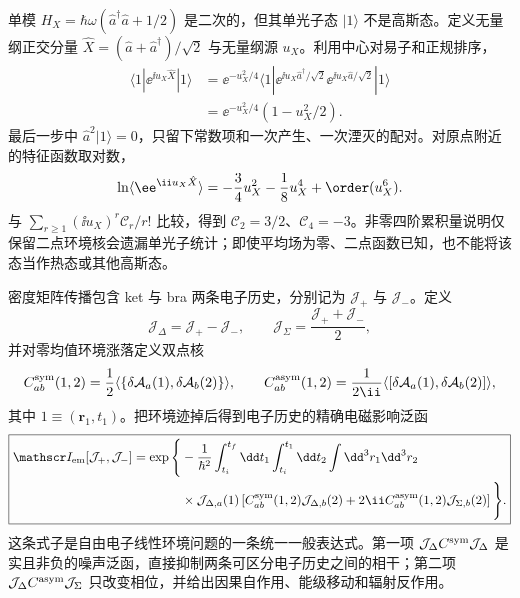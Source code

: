 \begin{note}[二次哈密顿量不保证高斯初态]
单模 $H_X=\hbar\omega(\hat a^\dagger\hat a+1/2)$ 是二次的，但其单光子态 $|1\rangle$ 不是高斯态。定义无量纲正交分量 $\hat X=(\hat a+\hat a^\dagger)/\sqrt2$ 与无量纲源 $u_X$。利用中心对易子和正规排序，
\begin{align*}
 \langle1|\ee^{\ii u_X\hat X}|1\rangle
 &=\ee^{-u_X^2/4}
 \langle1|\ee^{\ii u_X\hat a^\dagger/\sqrt2}
 \ee^{\ii u_X\hat a/\sqrt2}|1\rangle\\
 &=\ee^{-u_X^2/4}(1-u_X^2/2).
\end{align*}
最后一步中 $\hat a^2|1\rangle=0$，只留下常数项和一次产生、一次湮灭的配对。对原点附近的特征函数取对数，
\begin{equation*}
 \ln\langle\ee^{\ii u_X\hat X}\rangle
 =-\frac34u_X^2-\frac18u_X^4+\order(u_X^6).
\end{equation*}
与 $\sum_{r\geq1}(\ii u_X)^r\mathcal C_r/r!$ 比较，得到 $\mathcal C_2=3/2$、$\mathcal C_4=-3$。非零四阶累积量说明仅保留二点环境核会遗漏单光子统计；即使平均场为零、二点函数已知，也不能将该态当作热态或其他高斯态。
\end{note}

密度矩阵传播包含 ket 与 bra 两条电子历史，分别记为
$\mathcal J_+$ 与 $\mathcal J_-$。定义
\[
\mathcal J_\Delta=\mathcal J_+-\mathcal J_-,
\qquad
\mathcal J_\Sigma=\frac{\mathcal J_++\mathcal J_-}{2},
\]
并对零均值环境涨落定义双点核
\[
C_{ab}^{\rm sym}(1,2)
=\frac12\langle\{\delta\mathcal A_a(1),\delta\mathcal A_b(2)\}\rangle,
\qquad
C_{ab}^{\rm asym}(1,2)
=\frac1{2\ii}\langle[\delta\mathcal A_a(1),\delta\mathcal A_b(2)]\rangle,
\]
其中 $1\equiv(\mathbf r_1,t_1)$。把环境迹掉后得到电子历史的精确电磁影响泛函
\begin{equation}
\boxed{
\begin{aligned}
\mathscr I_{\rm em}[\mathcal J_+,\mathcal J_-]
=\exp\Bigg\{&-\frac1{\hbar^2}
\int_{t_i}^{t_f}\dd t_1
\int_{t_i}^{t_1}\dd t_2
\int\dd^3r_1\dd^3r_2\\
&\times\mathcal J_{\Delta,a}(1)
\left[
C_{ab}^{\rm sym}(1,2)\mathcal J_{\Delta,b}(2)
+2\ii C_{ab}^{\rm asym}(1,2)\mathcal J_{\Sigma,b}(2)
\right]\Bigg\}.
\end{aligned}}
\label{eq:em_gaussian_influence_functional}
\end{equation}
这条式子是自由电子线性环境问题的一条统一一般表达式。第一项
$\mathcal J_\Delta C^{\rm sym}\mathcal J_\Delta$ 是实且非负的噪声泛函，直接抑制两条可区分电子历史之间的相干；第二项
$\mathcal J_\Delta C^{\rm asym}\mathcal J_\Sigma$ 只改变相位，并给出因果自作用、能级移动和辐射反作用。

